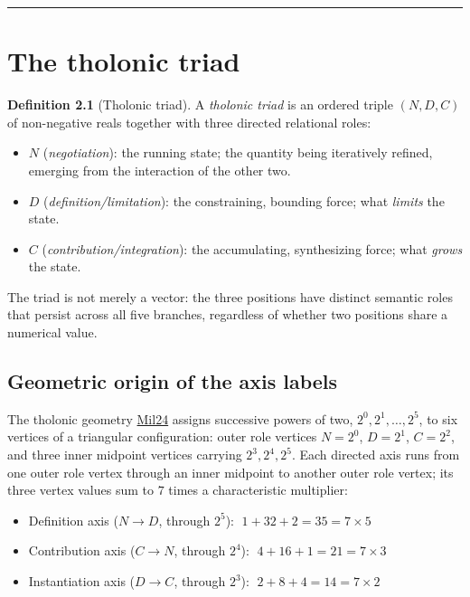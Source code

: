 \documentclass[12pt]{article}
\providecommand{\tightlist}{%
  \setlength{\itemsep}{0pt}\setlength{\parskip}{0pt}}
\begin{document}
\begin{center}\rule{0.5\linewidth}{0.5pt}\end{center}

\section{The tholonic triad}\label{the-tholonic-triad}

\textbf{Definition 2.1} (Tholonic triad). A \emph{tholonic triad} is an
ordered triple \((N, D, C)\) of non-negative reals together with three
directed relational roles:

\begin{itemize}
\tightlist
\item
  \(N\) (\emph{negotiation}): the running state; the quantity being
  iteratively refined, emerging from the interaction of the other two.
\item
  \(D\) (\emph{definition/limitation}): the constraining, bounding
  force; what \emph{limits} the state.
\item
  \(C\) (\emph{contribution/integration}): the accumulating,
  synthesizing force; what \emph{grows} the state.
\end{itemize}

The triad is not merely a vector: the three positions have distinct
semantic roles that persist across all five branches, regardless of
whether two positions share a numerical value.

\subsection{Geometric origin of the axis labels}\label{geometric-origin-of-the-axis-labels}

The tholonic geometry \href{https://tholonia.github.io/the-book/}{Mil24}
assigns successive powers of two, \(2^0, 2^1, \ldots, 2^5\), to six
vertices of a triangular configuration: outer role vertices \(N = 2^0\),
\(D = 2^1\), \(C = 2^2\), and three inner midpoint vertices carrying
\(2^3, 2^4, 2^5\). Each directed axis runs from one outer role vertex
through an inner midpoint to another outer role vertex; its three vertex
values sum to \(7\) times a characteristic multiplier:

\begin{itemize}
\tightlist
\item
  Definition axis (\(N \to D\), through \(2^5\)):
  \(\;1 + 32 + 2 = 35 = 7 \times 5\)
\item
  Contribution axis (\(C \to N\), through \(2^4\)):
  \(\;4 + 16 + 1 = 21 = 7 \times 3\)
\item
  Instantiation axis (\(D \to C\), through \(2^3\)):
  \(\;2 + 8 + 4 = 14 = 7 \times 2\)
\end{itemize}
\end{document}
